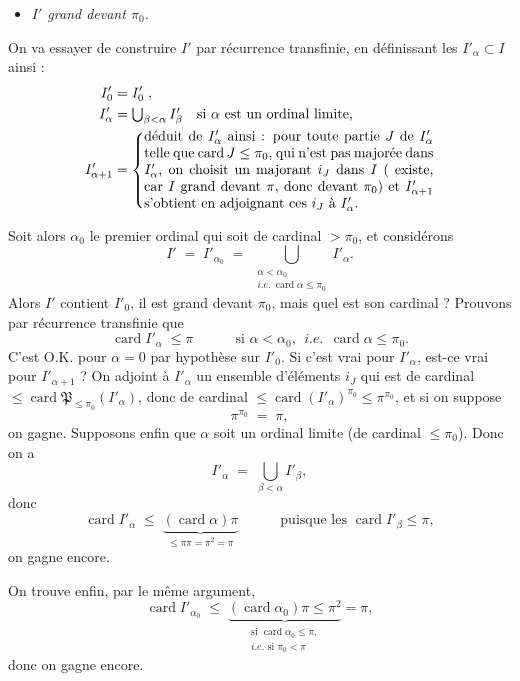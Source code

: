 \documentclass[11pt]{article}
\newcommand{\printedpage}[1]{\marginpar{\footnotesize p.~#1}}
\newcommand{\msp}[1]{\marginpar{\footnotesize [#1]}}
\newcommand{\card}{\operatorname{card}}
\begin{document}
\printedpage{44}

\begin{itemize}
\item[c)] \textit{$I'$ grand devant $\pi_0$.}
\end{itemize}


On va essayer de construire $I'$ par récurrence transfinie, en définissant les $I'_\alpha\subset I$ ainsi :
\[
\begin{aligned}
I'_0 &= I'_0\;, \\
I'_\alpha &= \textstyle\bigcup_{\beta<\alpha} I'_\beta \quad \text{si $\alpha$ est un ordinal limite,} \\
I'_{\alpha+1} &= \left\{\parbox{0.6\textwidth}{déduit de $I'_\alpha$ ainsi : pour toute partie $J$ de $I'_\alpha$ telle que $\card J\le\pi_0$, qui n'est pas majorée dans $I'_\alpha$, on choisit un majorant $i_J$ dans $I$ ( existe, car $I$ grand devant $\pi$, donc devant $\pi_0$) et $I'_{\alpha+1}$ s'obtient en adjoignant ces $i_J$ à $I'_\alpha$.}\right.
\end{aligned}
\]

\msp{page 81}
Soit alors $\alpha_0$ le premier ordinal qui soit de cardinal $>\pi_0$, et considérons
\[
I' \;=\; I'_{\alpha_0} \;=\; \bigcup\limits_{\substack{\alpha<\alpha_0\\ \textit{i.e.}\ \card\alpha\le\pi_0}} I'_\alpha .
\]
Alors $I'$ contient $I'_0$, il est grand devant $\pi_0$, mais quel est son cardinal ? Prouvons par récurrence transfinie que
\[
\card I'_\alpha \;\le\pi \qquad\quad \text{si } \alpha<\alpha_0,\ \ \textit{i.e.}\ \ \card\alpha\le\pi_0 .
\]
C'est O.K. pour $\alpha=0$ par hypothèse sur $I'_0$. Si c'est vrai pour $I'_\alpha$, est-ce vrai pour $I'_{\alpha+1}$ ? On adjoint à $I'_\alpha$ un ensemble d'éléments $i_J$ qui est de cardinal $\le\card\mathfrak{P}_{\le\pi_0}(I'_\alpha)$, donc de cardinal $\le\card(I'_\alpha)^{\pi_0}\le\pi^{\pi_0}$, et si on suppose
\[
\pi^{\pi_0} \;=\; \pi,
\]
on gagne. Supposons enfin que $\alpha$ soit un ordinal limite (de cardinal $\le\pi_0$). Donc on a
\[
I'_\alpha \;=\; \bigcup_{\beta<\alpha} I'_\beta ,
\]
donc
\printedpage{45}
\msp{page 82}
\[
\card I'_\alpha \;\le\; \underbrace{(\card\alpha)\pi}_{\le\pi\pi=\pi^2=\pi} \qquad\quad \text{puisque les } \card I'_\beta\le\pi,
\]
on gagne encore.

On trouve enfin, par le même argument,
\[
\card I'_{\alpha_0} \;\le\; \underbrace{(\card\alpha_0)\pi\le\pi^2}_{\substack{\text{si }\card\alpha_0\le\pi,\\ \textit{i.e.}\text{ si }\pi_0<\pi}} = \pi,
\]
donc on gagne encore.
\end{document}
